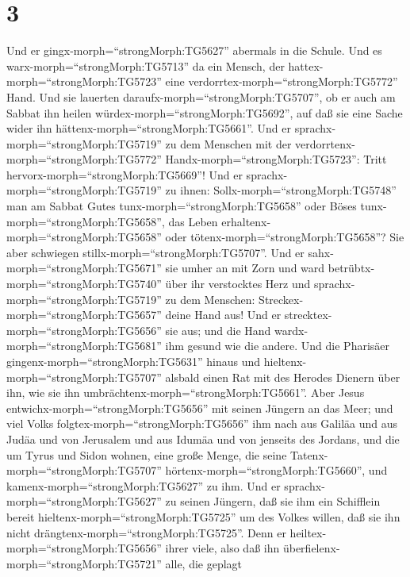 \hypertarget{section-2}{%
\section{3}\label{section-2}}

 Und er gingx-morph=``strongMorph:TG5627'' abermals in die
Schule. Und es warx-morph=``strongMorph:TG5713'' da ein Mensch, der
hattex-morph=``strongMorph:TG5723'' eine
verdorrtex-morph=``strongMorph:TG5772'' Hand.  Und sie
lauerten daraufx-morph=``strongMorph:TG5707'', ob er auch am Sabbat ihn
heilen würdex-morph=``strongMorph:TG5692'', auf daß sie eine Sache wider
ihn hättenx-morph=``strongMorph:TG5661''.  Und er
sprachx-morph=``strongMorph:TG5719'' zu dem Menschen mit der
verdorrtenx-morph=``strongMorph:TG5772''
Handx-morph=``strongMorph:TG5723'': Tritt
hervorx-morph=``strongMorph:TG5669''!  Und er
sprachx-morph=``strongMorph:TG5719'' zu ihnen:
Sollx-morph=``strongMorph:TG5748'' man am Sabbat Gutes
tunx-morph=``strongMorph:TG5658'' oder Böses
tunx-morph=``strongMorph:TG5658'', das Leben
erhaltenx-morph=``strongMorph:TG5658'' oder
tötenx-morph=``strongMorph:TG5658''? Sie aber schwiegen
stillx-morph=``strongMorph:TG5707''.  Und er
sahx-morph=``strongMorph:TG5671'' sie umher an mit Zorn und ward
betrübtx-morph=``strongMorph:TG5740'' über ihr verstocktes Herz und
sprachx-morph=``strongMorph:TG5719'' zu dem Menschen:
Streckex-morph=``strongMorph:TG5657'' deine Hand aus! Und er
strecktex-morph=``strongMorph:TG5656'' sie aus; und die Hand
wardx-morph=``strongMorph:TG5681'' ihm gesund wie die andere.
 Und die Pharisäer gingenx-morph=``strongMorph:TG5631''
hinaus und hieltenx-morph=``strongMorph:TG5707'' alsbald einen Rat mit
des Herodes Dienern über ihn, wie sie ihn
umbrächtenx-morph=``strongMorph:TG5661''.  Aber Jesus
entwichx-morph=``strongMorph:TG5656'' mit seinen Jüngern an das Meer;
und viel Volks folgtex-morph=``strongMorph:TG5656'' ihm nach aus Galiläa
und aus Judäa  und von Jerusalem und aus Idumäa und von
jenseits des Jordans, und die um Tyrus und Sidon wohnen, eine große
Menge, die seine Tatenx-morph=``strongMorph:TG5707''
hörtenx-morph=``strongMorph:TG5660'', und
kamenx-morph=``strongMorph:TG5627'' zu ihm.  Und er
sprachx-morph=``strongMorph:TG5627'' zu seinen Jüngern, daß sie ihm ein
Schifflein bereit hieltenx-morph=``strongMorph:TG5725'' um des Volkes
willen, daß sie ihn nicht drängtenx-morph=``strongMorph:TG5725''.
 Denn er heiltex-morph=``strongMorph:TG5656'' ihrer viele,
also daß ihn überfielenx-morph=``strongMorph:TG5721'' alle, die geplagt
